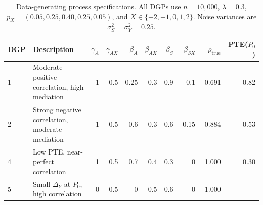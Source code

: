 \begin{table}[ht]
\centering
\caption{Data-generating process specifications. All DGPs use $n=10{,}000$,
$\lambda=0.3$, $p_X = (0.05, 0.25, 0.40, 0.25, 0.05)$,
and $X \in \{-2,-1,0,1,2\}$. Noise variances are $\sigma_S^2 = \sigma_Y^2 = 0.25$.}
\label{tab:dgp-specs}
\begin{tabular}{lp{6cm}rrrrrrrr}
\toprule
DGP & Description & $\gamma_A$ & $\gamma_{AX}$ & $\beta_A$ & $\beta_{AX}$ & $\beta_S$ & $\beta_{SX}$ & $\rho_{\mathrm{true}}$ & PTE($P_0$) \\
\midrule
1 & Moderate positive correlation, high mediation & 1 & 0.5 & 0.25 & -0.3 & 0.9 & -0.1 & 0.691 & 0.82 \\
2 & Strong negative correlation, moderate mediation & 1 & 0.5 & 0.6 & -0.3 & 0.6 & -0.15 & -0.884 & 0.53 \\
4 & Low PTE, near-perfect correlation & 1 & 0.5 & 0.7 & 0.4 & 0.3 & 0 & 1.000 & 0.30 \\
5 & Small $\Delta_Y$ at $P_0$, high correlation & 0 & 0.5 & 0 & 0.5 & 0.6 & 0 & 1.000 & --- \\
\bottomrule
\end{tabular}
\end{table}
